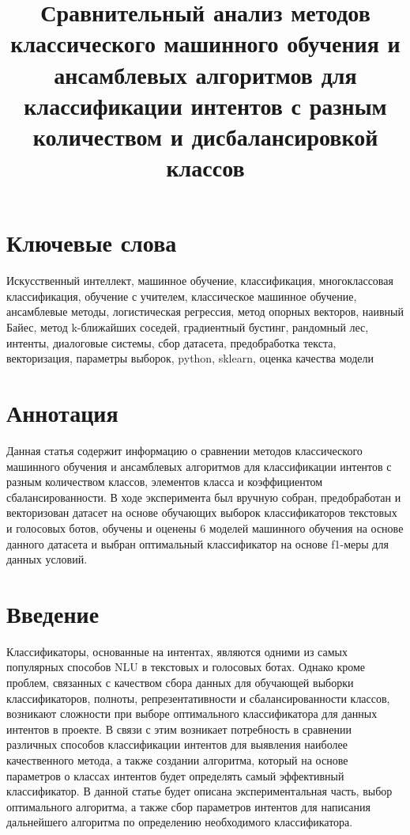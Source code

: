 \documentclass{article}
\begin{document}
\title{Сравнительный анализ методов классического машинного обучения и ансамблевых алгоритмов для классификации интентов с разным количеством и дисбалансировкой классов}

\maketitle
\section{Ключевые слова}
Искусственный интеллект, машинное обучение, классификация, многоклассовая классификация, обучение с учителем, классическое машинное обучение, ансамблевые методы, логистическая регрессия, метод опорных векторов, наивный Байес, метод k-ближайших соседей, градиентный бустинг, рандомный лес, интенты, диалоговые системы, сбор датасета, предобработка текста, векторизация, параметры выборок, python, sklearn, оценка качества модели

\section{Аннотация}
Данная статья содержит информацию о сравнении методов классического машинного обучения и ансамблевых алгоритмов для классификации интентов с разным количеством классов, элементов класса и коэффициентом сбалансированности. В ходе эксперимента был вручную собран, предобработан и векторизован датасет на основе обучающих выборок классификаторов текстовых и голосовых ботов, обучены и оценены 6 моделей машинного обучения на основе данного датасета и выбран оптимальный классификатор на основе f1-меры для данных условий.

\section{Введение}
Классификаторы, основанные на интентах, являются одними из самых популярных способов NLU в текстовых и голосовых ботах. Однако кроме проблем, связанных с качеством сбора данных для обучающей выборки классификаторов, полноты, репрезентативности и сбалансированности классов, возникают сложности при выборе оптимального классификатора для данных интентов в проекте. В связи с этим возникает потребность в сравнении различных способов классификации интентов для выявления наиболее качественного метода, а также создании алгоритма, который на основе параметров о классах интентов будет определять самый эффективный классификатор. В данной статье будет описана экспериментальная часть, выбор оптимального алгоритма, а также сбор параметров интентов для написания дальнейшего алгоритма по определению необходимого классификатора. 
\end{document}
